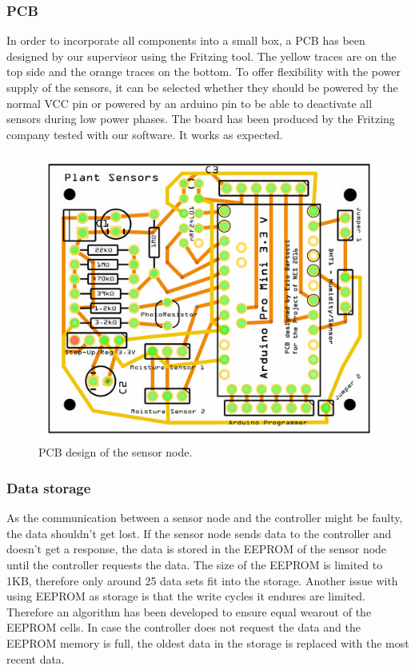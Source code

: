\subsubsection{PCB}
In order to incorporate all components into a small box, a PCB has been designed by our supervisor using the Fritzing tool. The yellow traces are on the top side and the orange traces on the bottom. To offer flexibility with the power supply of the sensors, it can be selected whether they should be powered by the normal VCC pin or powered by an arduino pin to be able to deactivate all sensors during low power phases.
The board has been produced by the Fritzing company tested with our software. It works as expected.
\begin{figure}[h!]
	\begin{center}
	\includegraphics[scale=0.3]{images/SensorNode_small.png}
	
	\caption{PCB design of the sensor node.}
	\label{Setup_overview}
	\end{center}
\end{figure}

\subsubsection{Data storage}
As the communication between a sensor node and the controller might be faulty, the data shouldn't get lost. If the sensor node sends data to the controller and doesn't get a response, the data is stored in the EEPROM of the sensor node until the controller requests the data.
The size of the EEPROM is limited to 1KB, therefore only around 25 data sets fit into the storage.
Another issue with using EEPROM as storage is that the write cycles it endures are limited. Therefore an algorithm has been developed to ensure equal wearout of the EEPROM cells. In case the controller does not request the data and the EEPROM memory is full, the oldest data in the storage is replaced with the most recent data. 

